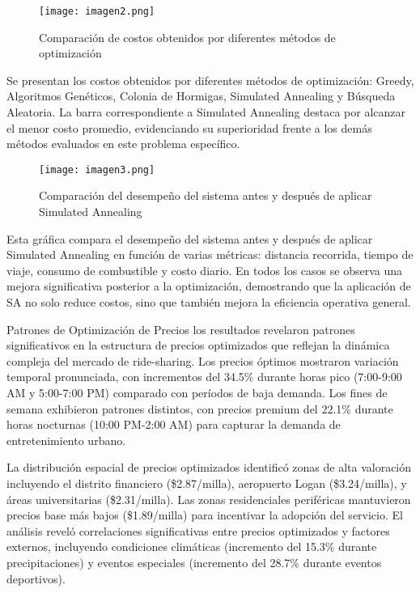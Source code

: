 \documentclass[12pt,a4paper,twocolumn]{article}
\begin{document}
\begin{figure}[h!]
\centering
\texttt{[image: imagen2.png]}
\caption{Comparación de costos obtenidos por diferentes métodos de optimización}
\end{figure}

Se presentan los costos obtenidos por diferentes métodos de optimización: Greedy, Algoritmos Genéticos, Colonia de Hormigas, Simulated Annealing y Búsqueda Aleatoria. La barra correspondiente a Simulated Annealing destaca por alcanzar el menor costo promedio, evidenciando su superioridad frente a los demás métodos evaluados en este problema específico.

\begin{figure}[h!]
\centering
\texttt{[image: imagen3.png]}
\caption{Comparación del desempeño del sistema antes y después de aplicar Simulated Annealing}
\end{figure}

Esta gráfica compara el desempeño del sistema antes y después de aplicar Simulated Annealing en función de varias métricas: distancia recorrida, tiempo de viaje, consumo de combustible y costo diario. En todos los casos se observa una mejora significativa posterior a la optimización, demostrando que la aplicación de SA no solo reduce costos, sino que también mejora la eficiencia operativa general.

Patrones de Optimización de Precios los resultados revelaron patrones significativos en la estructura de precios optimizados que reflejan la dinámica compleja del mercado de ride-sharing. Los precios óptimos mostraron variación temporal pronunciada, con incrementos del 34.5\% durante horas pico (7:00-9:00 AM y 5:00-7:00 PM) comparado con períodos de baja demanda. Los fines de semana exhibieron patrones distintos, con precios premium del 22.1\% durante horas nocturnas (10:00 PM-2:00 AM) para capturar la demanda de entretenimiento urbano.

La distribución espacial de precios optimizados identificó zonas de alta valoración incluyendo el distrito financiero (\$2.87/milla), aeropuerto Logan (\$3.24/milla), y áreas universitarias (\$2.31/milla). Las zonas residenciales periféricas mantuvieron precios base más bajos (\$1.89/milla) para incentivar la adopción del servicio. El análisis reveló correlaciones significativas entre precios optimizados y factores externos, incluyendo condiciones climáticas (incremento del 15.3\% durante precipitaciones) y eventos especiales (incremento del 28.7\% durante eventos deportivos).
\end{document}
